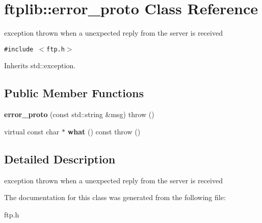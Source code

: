 \hypertarget{classftplib_1_1error__proto}{
\section{ftplib::error\_\-proto Class Reference}
\label{classftplib_1_1error__proto}
}
exception thrown when a unexpected reply from the server is received  


{\tt \#include $<$ftp.h$>$}

Inherits std::exception.

\subsection*{Public Member Functions}
\begin{CompactItemize}
\item 
\hypertarget{classftplib_1_1error__proto_4d9a71a8162f838cb1cdd2997f64819b}{
\textbf{error\_\-proto} (const std::string \&msg)  throw ()}
\label{classftplib_1_1error__proto_4d9a71a8162f838cb1cdd2997f64819b}

\item 
\hypertarget{classftplib_1_1error__proto_67fb850475bc3becb1959822d0d6f470}{
virtual const char $\ast$ \textbf{what} () const   throw ()}
\label{classftplib_1_1error__proto_67fb850475bc3becb1959822d0d6f470}

\end{CompactItemize}


\subsection{Detailed Description}
exception thrown when a unexpected reply from the server is received 

The documentation for this class was generated from the following file:\begin{CompactItemize}
\item 
ftp.h\end{CompactItemize}

